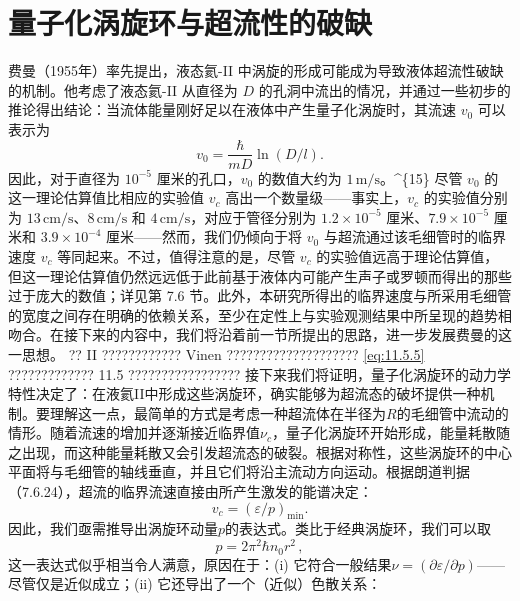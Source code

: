 \section{量子化涡旋环与超流性的破缺}\label{ux91cfux5b50ux5316ux6da1ux65cbux73afux4e0eux8d85ux6d41ux6027ux7684ux7834ux7f3a}
费曼（1955年）率先提出，液态氦-II 中涡旋的形成可能成为导致液体超流性破缺的机制。他考虑了液态氦-II 从直径为 \(D\) 的孔洞中流出的情况，并通过一些初步的推论得出结论：当流体能量刚好足以在液体中产生量子化涡旋时，其流速 \(v_0\) 可以表示为
\begin{equation}\tag{11.6.1}\label{eq:11.6.1}
v _ { 0 } = \frac { \hbar } { m D } \ln ( D / l ) .
\end{equation}
因此，对于直径为 \(10^{-5}\) 厘米的孔口，\(v_{0}\) 的数值大约为 \(1\,\mathrm{m/s}\)。\^{}\{15\} 尽管 \(v_{0}\) 的这一理论估算值比相应的实验值 \(v_{c}\) 高出一个数量级——事实上，\(v_{c}\) 的实验值分别为 \(13\,\mathrm{cm/s}\)、\(8\,\mathrm{cm/s}\) 和 \(4\,\mathrm{cm/s}\)，对应于管径分别为 \(1.2 \times 10^{-5}\) 厘米、\(7.9 \times 10^{-5}\) 厘米和 \(3.9 \times 10^{-4}\) 厘米——然而，我们仍倾向于将 \(v_{0}\) 与超流通过该毛细管时的临界速度 \(v_{c}\) 等同起来。不过，值得注意的是，尽管 \(v_{c}\) 的实验值远高于理论估算值，但这一理论估算值仍然远远低于此前基于液体内可能产生声子或罗顿而得出的那些过于庞大的数值；详见第 7.6 节。此外，本研究所得出的临界速度与所采用毛细管的宽度之间存在明确的依赖关系，至少在定性上与实验观测结果中所呈现的趋势相吻合。在接下来的内容中，我们将沿着前一节所提出的思路，进一步发展费曼的这一思想。
?? II ???????????? Vinen ???????????????????? \autoref{eq:11.5.5} ????????????? 11.5 ?????????????????
接下来我们将证明，量子化涡旋环的动力学特性决定了：在液氦II中形成这些涡旋环，确实能够为超流态的破坏提供一种机制。要理解这一点，最简单的方式是考虑一种超流体在半径为\(R\)的毛细管中流动的情形。随着流速的增加并逐渐接近临界值\(\nu_{c}\)，量子化涡旋环开始形成，能量耗散随之出现，而这种能量耗散又会引发超流态的破裂。根据对称性，这些涡旋环的中心平面将与毛细管的轴线垂直，并且它们将沿主流动方向运动。根据朗道判据（7.6.24），超流的临界流速直接由所产生激发的能谱决定：
\begin{equation}\tag{11.6.2}\label{eq:11.6.2}
v _ { c } = ( \varepsilon / p ) _ { \mathrm { m i n } } .
\end{equation}
因此，我们亟需推导出涡旋环动量\(p\)的表达式。类比于经典涡旋环，我们可以取
\begin{equation}\tag{11.6.3}\label{eq:11.6.3}
p = 2 \pi ^{2} \hbar n _ { 0 } r ^{2} \, ,
\end{equation}
这一表达式似乎相当令人满意，原因在于：(i) 它符合一般结果\(\nu=(\partial\varepsilon/\partial p)\)——尽管仅是近似成立；(ii) 它还导出了一个（近似）色散关系：
